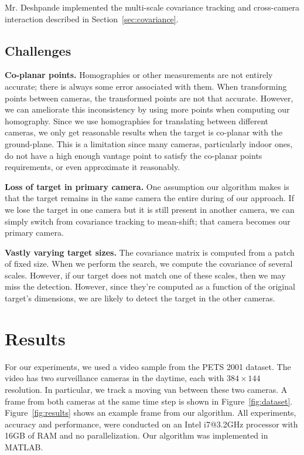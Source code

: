 \documentclass{article}
\begin{document}
Mr. Deshpande implemented the multi-scale covariance tracking and cross-camera interaction described in Section~\ref{sec:covariance}.

\subsection{Challenges}
\vspace{5pt}
\noindent\textbf{Co-planar points.} Homographies or other measurements are not entirely accurate; there is always some error associated with them. When transforming points between cameras, the transformed points are not that accurate. However, we can ameliorate this inconsistency by using more points when computing our homography. Since we use homographies for translating between different cameras, we only get reasonable results when the target is co-planar with the ground-plane. This is a limitation since many cameras, particularly indoor ones, do not have a high enough vantage point to satisfy the co-planar points requirements, or even approximate it reasonably.

\vspace{5pt}
\noindent\textbf{Loss of target in primary camera.} One assumption our algorithm makes is that the target remains in the same camera the entire during of our approach. If we lose the target in one camera but it is still present in another camera, we can simply switch from covariance tracking to mean-shift; that camera becomes our primary camera.

\vspace{5pt}
\noindent\textbf{Vastly varying target sizes.} The covariance matrix is computed from a patch of fixed size. When we perform the search, we compute the covariance of several scales. However, if our target does not match one of these scales, then we may miss the detection. However, since they're computed as a function of the original target's dimensions, we are likely to detect the target in the other cameras.

\section{Results}
\label{sec:results}
For our experiments, we used a video sample from the PETS 2001 dataset. The video has two surveillance cameras in the daytime, each with $384\times 144$ resolution. In particular, we track a moving van between these two cameras. A frame from both cameras at the same time step is shown in Figure~\ref{fig:dataset}. Figure~\ref{fig:results} shows an example frame from our algorithm. All experiments, accuracy and performance, were conducted on an Intel i7@3.2GHz processor with 16GB of RAM and no parallelization. Our algorithm was implemented in MATLAB.
\end{document}
